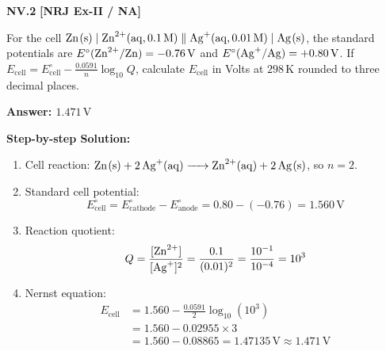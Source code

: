 \begin{problembox}
\textbf{NV.2} \hfill \textbf{[NRJ Ex-II / NA]}

For the cell $\ce{Zn(s)} \mid \ce{Zn^2+(aq, } 0.1\,\text{M}\ce{)} \parallel \ce{Ag+(aq, } 0.01\,\text{M}\ce{)} \mid \ce{Ag(s)}$, the standard potentials are $E^\circ(\ce{Zn^2+/Zn}) = -0.76\,\text{V}$ and $E^\circ(\ce{Ag+/Ag}) = +0.80\,\text{V}$. If $E_{\text{cell}} = E^\circ_{\text{cell}} - \frac{0.0591}{n}\log_{10} Q$, calculate $E_{\text{cell}}$ in Volts at $298\,\text{K}$ rounded to three decimal places.
\end{problembox}
\begin{solution}
\textbf{Answer: $1.471\,\text{V}$}

\textbf{Step-by-step Solution:}
\begin{enumerate}
    \item Cell reaction: $\ce{Zn(s) + 2Ag+(aq) -> Zn^2+(aq) + 2Ag(s)}$, so $n = 2$.
    \item Standard cell potential:
    \begin{equation*}
        E^\circ_{\text{cell}} = E^\circ_{\text{cathode}} - E^\circ_{\text{anode}} = 0.80 - (-0.76) = 1.560\,\text{V}
    \end{equation*}
    \item Reaction quotient:
    \begin{equation*}
        Q = \frac{[\ce{Zn^2+}]}{[\ce{Ag+}]^2} = \frac{0.1}{(0.01)^2} = \frac{10^{-1}}{10^{-4}} = 10^3
    \end{equation*}
    \item Nernst equation:
    \begin{align*}
        E_{\text{cell}} &= 1.560 - \frac{0.0591}{2} \log_{10}(10^3) \\
        &= 1.560 - 0.02955 \times 3 \\
        &= 1.560 - 0.08865 = 1.47135\,\text{V} \approx 1.471\,\text{V}
    \end{align*}
\end{enumerate}
\end{solution}

